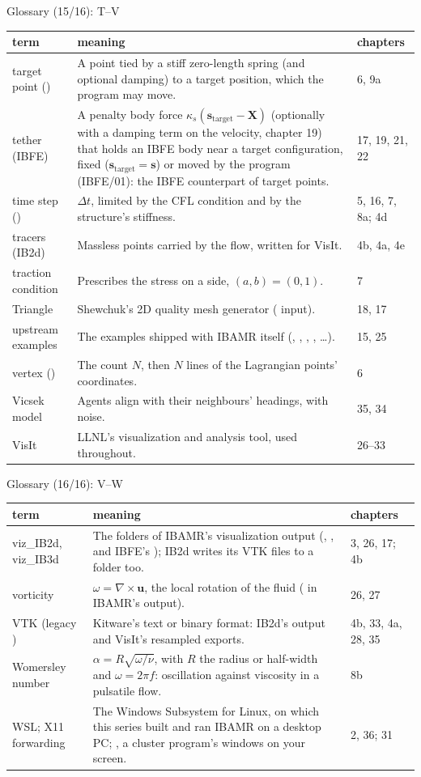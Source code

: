 \documentclass[aspectratio=169,11pt]{beamer}
\makeatletter
\newenvironment{glossarytable}{\scriptsize\renewcommand{\arraystretch}{1.08}%
  \begin{tabular}{@{}L{0.19\textwidth}L{0.63\textwidth}L{0.12\textwidth}@{}}\toprule
  term & meaning & chapters\\\midrule}{\bottomrule\end{tabular}}
\makeatother
\begin{document}
\begin{frame}{Glossary (15/16): T--V}
\label{fr:g15}
\begin{glossarytable}
target point () & A point tied by a stiff zero-length spring (and optional damping) to a target position, which the program may move. & 6, 9a\\
tether (IBFE) & A penalty body force $\kappa_s(\mathbf{s}_{\mathrm{target}} - \mathbf{X})$ (optionally with a damping term on the velocity, chapter 19) that holds an IBFE body near a target configuration, fixed ($\mathbf{s}_{\mathrm{target}} = \mathbf{s}$) or moved by the program (IBFE/01): the IBFE counterpart of target points. & 17, 19, 21, 22\\
time step () & $\Delta t$, limited by the CFL condition and by the structure's stiffness. & 5, 16, 7, 8a; 4d\\
tracers (IB2d) & Massless points carried by the flow, written for VisIt. & 4b, 4a, 4e\\
traction condition & Prescribes the stress on a side, $(a, b) = (0, 1)$. & 7\\
Triangle & Shewchuk's 2D quality mesh generator ( input). & 18, 17\\
upstream examples & The examples shipped with IBAMR itself (, , , , \ldots). & 15, 25\\
vertex () & The count $N$, then $N$ lines of the Lagrangian points' coordinates. & 6\\
Vicsek model & Agents align with their neighbours' headings, with noise. & 35, 34\\
VisIt & LLNL's visualization and analysis tool, used throughout. & 26--33\\
\end{glossarytable}
\end{frame}

\begin{frame}{Glossary (16/16): V--W}
\label{fr:g16}
\begin{glossarytable}
viz\_IB2d, viz\_IB3d & The folders of IBAMR's visualization output (, , and IBFE's ); IB2d writes its VTK files to a  folder too. & 3, 26, 17; 4b\\
vorticity & $\omega = \nabla\times\mathbf{u}$, the local rotation of the fluid ( in IBAMR's output). & 26, 27\\
VTK (legacy ) & Kitware's text or binary format: IB2d's output and VisIt's resampled exports. & 4b, 33, 4a, 28, 35\\
Womersley number & $\alpha = R\sqrt{\omega/\nu}$, with $R$ the radius or half-width and $\omega = 2\pi f$: oscillation against viscosity in a pulsatile flow. & 8b\\
WSL; X11 forwarding & The Windows Subsystem for Linux, on which this series built and ran IBAMR on a desktop PC; , a cluster program's windows on your screen. & 2, 36; 31\\
\end{glossarytable}
\end{frame}
\end{document}
